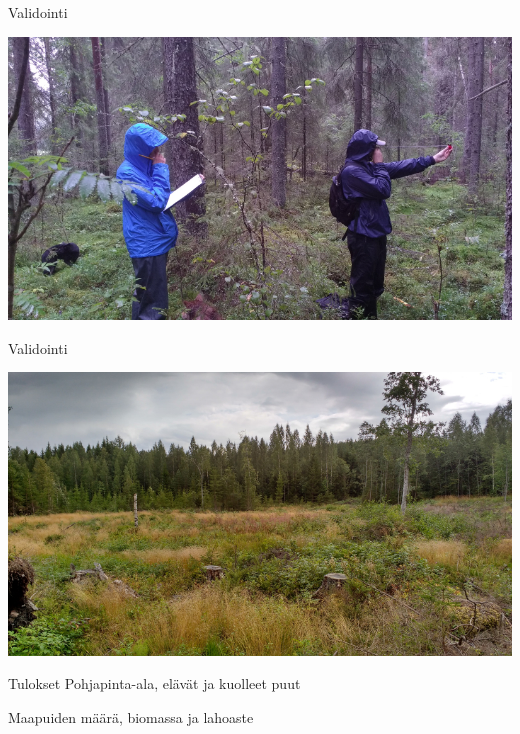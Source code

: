 \documentclass{beamer}
\begin{document}
\begin{frame}{Validointi}
   \begin{center}
    \includegraphics[width=\textwidth]{validointi2.jpg}
  \end{center}
\end{frame}

\begin{frame}{Validointi}
   \begin{center}
    \includegraphics[width=\textwidth]{validointi1.jpg}
  \end{center}
\end{frame}


\begin{frame}{Tulokset}
  Pohjapinta-ala, elävät ja kuolleet puut

  Maapuiden määrä, biomassa ja lahoaste
\end{frame}
\end{document}
